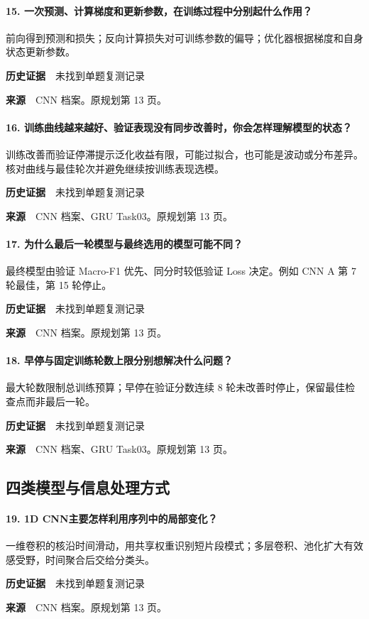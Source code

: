 \paragraph{15. 一次预测、计算梯度和更新参数，在训练过程中分别起什么作用？}
前向得到预测和损失；反向计算损失对可训练参数的偏导；优化器根据梯度和自身状态更新参数。\par
\textbf{历史证据}　未找到单题复测记录\par
\textbf{来源}　CNN 档案。原规划第 13 页。\par
\paragraph{16. 训练曲线越来越好、验证表现没有同步改善时，你会怎样理解模型的状态？}
训练改善而验证停滞提示泛化收益有限，可能过拟合，也可能是波动或分布差异。核对曲线与最佳轮次并避免继续按训练表现选模。\par
\textbf{历史证据}　未找到单题复测记录\par
\textbf{来源}　CNN 档案、GRU Task03。原规划第 13 页。\par
\paragraph{17. 为什么最后一轮模型与最终选用的模型可能不同？}
最终模型由验证 Macro-F1 优先、同分时较低验证 Loss 决定。例如 CNN A 第 7 轮最佳，第 15 轮停止。\par
\textbf{历史证据}　未找到单题复测记录\par
\textbf{来源}　CNN 档案。原规划第 13 页。\par
\paragraph{18. 早停与固定训练轮数上限分别想解决什么问题？}
最大轮数限制总训练预算；早停在验证分数连续 8 轮未改善时停止，保留最佳检查点而非最后一轮。\par
\textbf{历史证据}　未找到单题复测记录\par
\textbf{来源}　CNN 档案、GRU Task03。原规划第 13 页。\par
\clearpage\subsection{四类模型与信息处理方式}
\paragraph{19. 1D CNN主要怎样利用序列中的局部变化？}
一维卷积的核沿时间滑动，用共享权重识别短片段模式；多层卷积、池化扩大有效感受野，时间聚合后交给分类头。\par
\textbf{历史证据}　未找到单题复测记录\par
\textbf{来源}　CNN 档案。原规划第 13 页。\par
